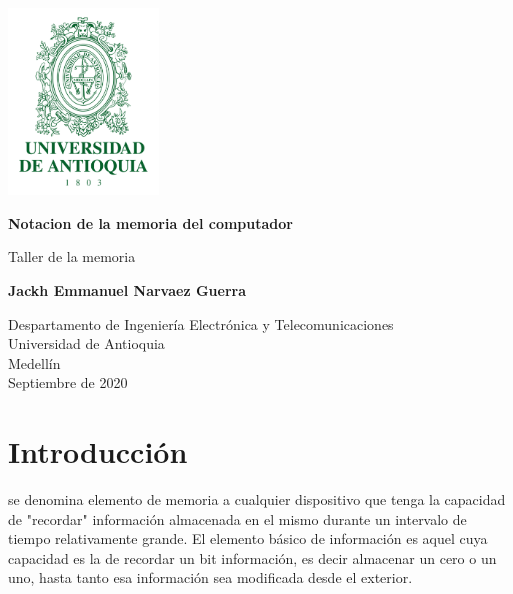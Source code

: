 \documentclass{article}
\begin{document}
\begin{titlepage}
\renewcommand{\headrulewidth}{3pt}
\fancyhead[L]{}
\fancyhead[R]{}
    \includegraphics[width=4cm]{imagen.png}
    \begin{center}
        \vspace*{1cm} 
            
        \Huge
        \textbf{Notacion de la memoria del computador}
            
        \vspace{0.8 cm
}
        
        \LARGE
        Taller de la memoria 
            
        \vspace{1.5cm}
            
        \textbf{Jackh Emmanuel Narvaez Guerra}
            
        \vfill
            
        \vspace{0.8cm}
            
        \Large
        Despartamento de Ingeniería Electrónica y Telecomunicaciones\\
        Universidad de Antioquia\\
        Medellín\\
        Septiembre de 2020
            
    \end{center}
\end{titlepage}
\thispagestyle{fancy}

\tableofcontents
 
\section{Introducción}
se denomina elemento de memoria a cualquier dispositivo que tenga la capacidad de "recordar" información almacenada en el mismo durante un intervalo de tiempo relativamente grande. El elemento básico de información es aquel cuya capacidad es la de recordar un bit información, es decir almacenar un cero o un uno, hasta tanto esa información sea modificada desde el exterior.
\end{document}
